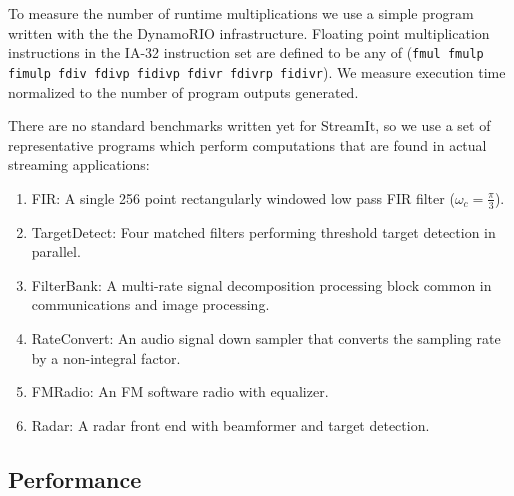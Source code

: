 To measure the number of runtime multiplications we use a simple program written with the 
the DynamoRIO\cite{dynamo99} infrastructure. Floating point multiplication instructions 
in the IA-32 instruction set are defined to be any of ({\tt fmul fmulp fimulp fdiv fdivp fidivp fdivr fdivrp fidivr}).
We measure execution time normalized to the number of program outputs generated.

There are no standard benchmarks written yet for StreamIt, so we use
a set of representative programs which perform computations that 
are found in actual streaming applications: 

\begin{enumerate}
\item FIR: A single 256 point rectangularly windowed low pass FIR filter ($\omega_c=\frac{\pi}{3}$).
\vspace{-6pt}

\item TargetDetect: Four matched filters performing threshold target detection in parallel.
\vspace{-6pt}

\item FilterBank: A multi-rate signal decomposition processing block common in communications and image processing.
\vspace{-6pt}

\item RateConvert: An audio signal down sampler that converts the sampling rate by a non-integral factor.
\vspace{-6pt}

\item FMRadio: An FM software radio with equalizer.
\vspace{-6pt}

\item Radar: A radar front end with beamformer and target detection.
\vspace{-6pt}
\end{enumerate}




\subsection{Performance}


